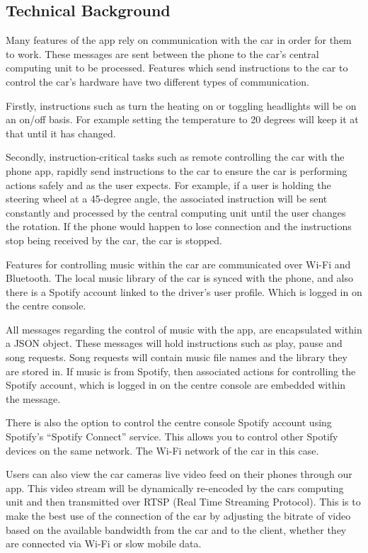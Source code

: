 \documentclass{article}
\begin{document}
\subsection{Technical Background}\label{ssec:app-tech} %
Many features of the app rely on communication with the car in order for them to work. These messages are sent between the phone to the car's central computing unit to be processed. Features which send instructions to the car to control the car's hardware have two different types of communication.

Firstly, instructions such as turn the heating on or toggling headlights will be on an on/off basis. For example setting the temperature to 20 degrees will keep it at that until it has changed.

Secondly, instruction-critical tasks such as remote controlling the car with the phone app, rapidly send instructions to the car to ensure the car is performing actions safely and as the user expects. For example, if a user is holding the steering wheel at a 45-degree angle, the associated instruction will be sent constantly and processed by the central computing unit until the user changes the rotation. If the phone would happen to lose connection and the instructions stop being received by the car, the car is stopped.

Features for controlling music within the car are communicated over Wi-Fi and Bluetooth. The local music library of the car is synced with the phone, and also there is a Spotify account linked to the driver's user profile. Which is logged in on the centre console.

All messages regarding the control of music with the app, are encapsulated within a JSON object. These messages will hold instructions such as play, pause and song requests. Song requests will contain music file names and the library they are stored in.
If music is from Spotify, then associated actions for controlling the Spotify account, which is logged in on the centre console are embedded within the message.

There is also the option to control the centre console Spotify account using Spotify's ``Spotify Connect'' service. This allows you to control other Spotify devices on the same network. The Wi-Fi network of the car in this case.

Users can also view the car cameras live video feed on their phones through our app. This video stream will be dynamically re-encoded by the cars computing unit and then transmitted over RTSP (Real Time Streaming Protocol). This is to make the best use of the connection of the car by adjusting the bitrate of video based on the available bandwidth from the car and to the client, whether they are connected via Wi-Fi or slow mobile data.
\end{document}
